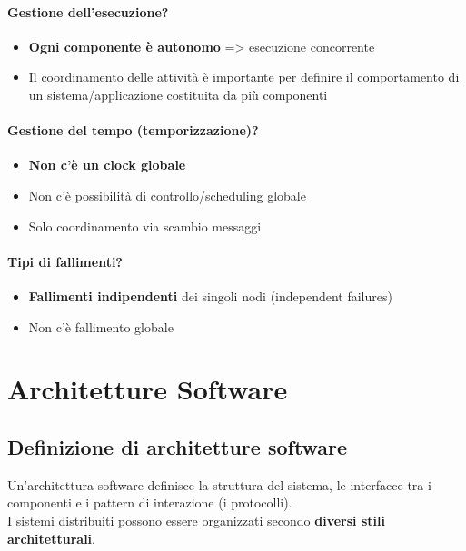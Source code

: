 \subsubsection{Gestione dell'esecuzione?}
\begin{itemize}
    \item \textbf{Ogni componente è autonomo} => esecuzione concorrente
    \item Il coordinamento delle attività è importante per definire il comportamento di un sistema/applicazione costituita da più componenti
\end{itemize}

\subsubsection{Gestione del tempo (temporizzazione)?}
\begin{itemize}
    \item \textbf{Non c'è un clock globale}
    \item Non c'è possibilità di controllo/scheduling globale
    \item Solo coordinamento via scambio messaggi
\end{itemize}

\subsubsection{Tipi di fallimenti?}
\begin{itemize}
    \item \textbf{Fallimenti indipendenti} dei singoli nodi (independent failures)
    \item Non c'è fallimento globale
\end{itemize}


\chapter{Architetture Software}
\section{Definizione di architetture software}
Un'architettura software definisce la struttura del sistema, le interfacce tra i componenti e i pattern di interazione (i protocolli). 
\\I sistemi distribuiti possono essere organizzati secondo \textbf{diversi stili architetturali}.

